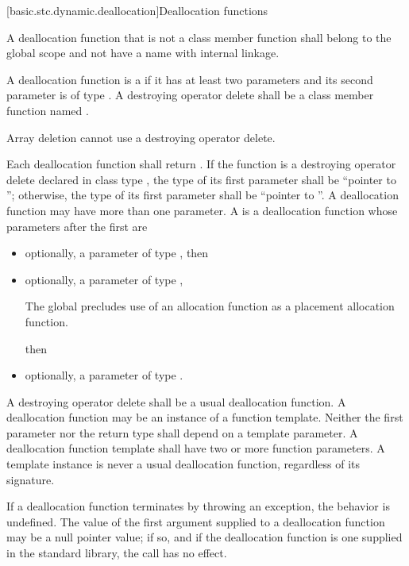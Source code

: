[basic.stc.dynamic.deallocation]{Deallocation functions}

\pnum
{}%
A deallocation function that is not a class member function
shall belong to the global scope and not have a name with internal linkage.

\pnum
A deallocation function
is a 
if it has at least two parameters
and its second parameter
is of type .
A destroying operator delete
shall be a class member function named .
\begin{note}
Array deletion cannot use a destroying operator delete.
\end{note}

\pnum
{}%
Each deallocation function shall return .
If the function is a destroying operator delete
declared in class type ,
the type of its first parameter shall be ``pointer to '';
otherwise, the type of its first
parameter shall be ``pointer to ''. A deallocation function may have more
than one parameter.
%
A  is a deallocation function
whose parameters after the first are
\begin{itemize}
\item
optionally, a parameter of type , then
\item
optionally, a parameter of type ,
\begin{footnote}
The global 
precludes use of an
allocation function  as a placement
allocation function.
\end{footnote}
then
\item
optionally, a parameter of type .
\end{itemize}
A destroying operator delete shall be a usual deallocation function.
A deallocation function may be an instance of a function
template. Neither the first parameter nor the return type shall depend
on a template parameter.
A deallocation
function template shall have two or more function parameters. A template
instance is never a usual deallocation function, regardless of its
signature.

\pnum
If a deallocation function terminates by throwing an exception, the behavior is undefined.
The value of the first argument supplied to a deallocation function may
be a null pointer value; if so, and if the deallocation function is one
supplied in the standard library, the call has no effect.

